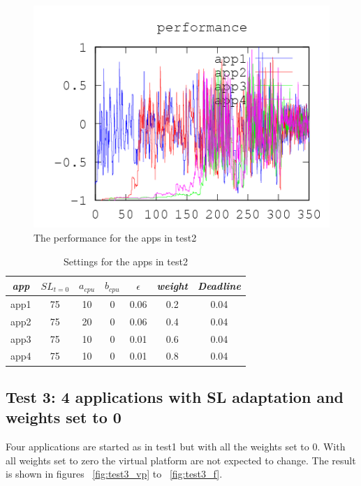 \documentclass[nobiblatex]{LTHthesis}
\begin{document}
\begin{figure}[!H]
  \centering
  \includegraphics{"tools/plot/logs/test2/f"}
  \caption{The performance for the apps in test2}
  \label{fig:test2_f}
\end{figure}

\begin{table}[h]
  \centering
  \begin{tabular}{|c|c|c|c|c|c|c|}
 	\hline 
   \emph{app} & $SL_{t=0}$ & \textbf{$a_{cpu}$} & \textbf{$b_{cpu}$} & \textbf{$\epsilon$} & \emph{weight} & \emph{Deadline} \\ \hline
	app1 & 75 & 10 & 0 & 0.06 & 0.2 &0.04  \\ \hline
	app2 & 75 & 20 & 0 & 0.06 & 0.4 &0.04  \\ \hline
	app3 & 75 & 10 & 0 & 0.01 & 0.6 &0.04  \\ \hline
	app4 & 75 & 10 & 0 & 0.01 & 0.8 &0.04  \\ \hline        
  \end{tabular}
  \caption{Settings for the apps in test2}
  \label{tab:settings_test2}
\end{table}




\subsection{Test 3: 4 applications with SL adaptation and weights set to 0}
Four applications are started as in test1 but with all the weights set to 0.
With all weights set to zero the virtual platform are not expected to change.
The result is shown in figures ~\ref{fig:test3_vp} to ~\ref{fig:test3_f}. 
\end{document}
